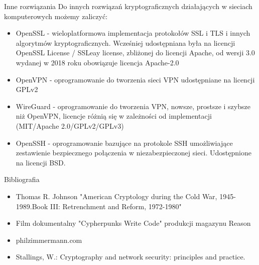 \documentclass[aspectratio=169]{beamer}
\begin{document}
\begin{frame}{Inne rozwiązania}
    Do innych rozwiązań kryptograficznych działających w sieciach komputerowych możemy zaliczyć:
    \begin{itemize}
        \item OpenSSL - wieloplatformowa implementacja protokołów SSL i TLS i innych algorytmów kryptograficznych. Wcześniej udostępniana była na licencji OpenSSL License / SSLeay license, zbliżonej do licencji Apache, od wersji 3.0 wydanej w 2018 roku obowiązuje licencja Apache-2.0
        \item OpenVPN - oprogramowanie do tworzenia sieci VPN udostępniane na licencji GPLv2
        \item WireGuard - oprogramowanie do tworzenia VPN, nowsze, prostsze i szybsze niż OpenVPN, licencje różnią się w zależności od implementacji (MIT/Apache 2.0/GPLv2/GPLv3)
        \item OpenSSH - oprogramowanie bazujące na protokole SSH umożliwiające zestawienie bezpiecznego połączenia w niezabezpieczonej sieci. Udostępnione na licencji BSD.
    \end{itemize}
\end{frame}

\begin{frame}{Bibliografia}
    \begin{itemize}
        \item Thomas R. Johnson "American Cryptology during the Cold War, 1945-1989.Book III: Retrenchment and Reform, 1972-1980"
        \item Film dokumentalny "Cypherpunks Write Code" produkcji magazynu Reason
        \item philzimmermann.com
        \item Stallings, W.: Cryptography and network security: principles and practice.
    \end{itemize}
\end{frame}

\pglastframe

\end{document}
